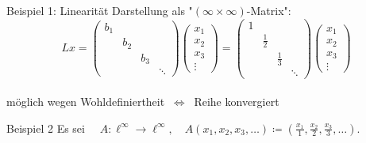 \documentclass[AERbeamer%
,handout%
,optBeamerClassicFormat%
,optLeftEquations   %
]{AERlatex}
\begin{document}
%
    \begin{frame}{Beispiel 1: Linearität}
        Darstellung als "$(\infty \times \infty)$-Matrix":
        \begin{equation*}
            Lx = \left(\begin{array}{llll}
                           b_1 &     &     &        \\
                           & b_2 &     &        \\
                           &     & b_3 &        \\
                           &     &     & \ddots
            \end{array}\right)
            \left(\begin{array}{c}
                      x_1 \\
                      x_2 \\
                      x_3 \\
                      \vdots
            \end{array}\right) =
            \left(\begin{array}{llll}
                      1 &             &             &        \\
                      & \frac{1}{2} &             &        \\
                      &             & \frac{1}{3} &        \\
                      &             &             & \ddots
            \end{array}\right)
            \left(\begin{array}{c}
                      x_1 \\
                      x_2 \\
                      x_3 \\
                      \vdots
            \end{array}\right)
        \end{equation*} \\ \pause
        möglich wegen Wohldefiniertheit $~\Leftrightarrow~$ Reihe konvergiert
    \end{frame}
%
    \begin{frame}{Beispiel 2}
        \setlength{\baselineskip}{1.6\baselineskip}
        Es sei $\quad A: \ell^{\infty} \rightarrow \ell^{\infty}, \quad A\left(x_1, x_2, x_3, \ldots\right)\coloneqq\left(\frac{x_1}{1}, \frac{x_2}{2}, \frac{x_3}{3}, \ldots\right)$.
    \end{frame}
\end{document}
